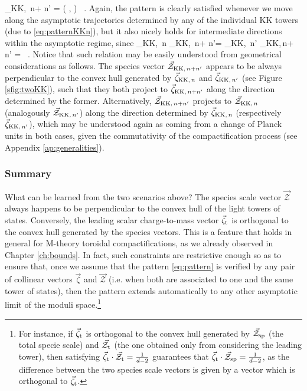 %
\beq
	\vec{\zeta}_{{\rm KK},\, n+ n'} = \left( ,  \right) \, .
\eeq
%
Again, the pattern is clearly satisfied whenever we move along the asymptotic trajectories determined by any of the individual KK towers (due to \eqref{eq:patternKKn}), but it also nicely holds for intermediate directions within the asymptotic regime, since 
%
\beq\label{eq:doubleKK}
	\vec{\zeta}_{{\rm KK},\, n} \cdot {}_{{\rm KK},\, n+ n'}= \vec{\zeta}_{{\rm KK},\, n'} \cdot {}_{{\rm KK},\,n+ n'} = \, .
\eeq
%
Notice that such relation may be easily understood from geometrical considerations as follows. The species vector $\vec{\mathcal{Z}}_{{\rm KK},\, n+n'}$ appears to be always perpendicular to the convex hull generated by $\vec{\zeta}_{{\rm KK},\, n}$ and $\vec{\zeta}_{{\rm KK},\, n'}$ (see Figure \ref{sfig:twoKK}), such that they both project to $\vec{\zeta}_{{\rm KK},\,  n+n'}$ along the direction determined by the former. Alternatively, $\vec{\mathcal{Z}}_{{\rm KK},\,  n+n'}$ projects to $\vec{\mathcal{Z}}_{{\rm KK},\, n}$ (analogously $\vec{\mathcal{Z}}_{{\rm KK},\, n'}$) along the direction determined by $\vec{\zeta}_{{\rm KK},\, n}$ (respectively $\vec{\zeta}_{{\rm KK},\, n'}$), which may be understood again as coming from a change of Planck units in both cases, given the commutativity of the compactification process (see Appendix \ref{ap:generalities}).
	
\subsubsection*{Summary}
	
What can be learned from the two scenarios above? The species scale vector $\vec{\mathcal{Z}}$ always happens to be perpendicular to the convex hull of the light towers of states. Conversely, the leading scalar charge-to-mass vector $\vec{\zeta}_{\rm t}$ is orthogonal to the convex hull generated by the species vectors. This is a feature that holds in general for M-theory toroidal compactifications, as we already observed in Chapter \ref{ch:bounds}. In fact, such constraints are restrictive enough so as to ensure that, once we assume that the pattern \eqref{eq:pattern} is verified by any pair of collinear vectors $\vec{\zeta}$ and $\vec{\mathcal{Z}}$ (i.e. when both are associated to one and the same tower of states), then the pattern extends automatically to any other asymptotic limit of the moduli space.\footnote{For instance, if $\vec{\zeta}_{\rm t}$ is orthogonal to the convex hull generated by $\vec{\mathcal{Z}}_{\rm sp}$ (the total specie scale) and $\vec{\mathcal{Z}}_{\rm t}$ (the one obtained only from considering the leading tower), then satisfying $\vec{\zeta}_{\rm t}\cdot \vec{\mathcal{Z}}_{\rm t}=\frac1{d-2}$ guarantees that $\vec{\zeta}_{\rm t}\cdot \vec{\mathcal{Z}}_{\rm sp}=\frac1{d-2}$, as the difference between the two species scale vectors is given by a vector which is orthogonal to $\vec{\zeta}_{\rm t}$.}
	
